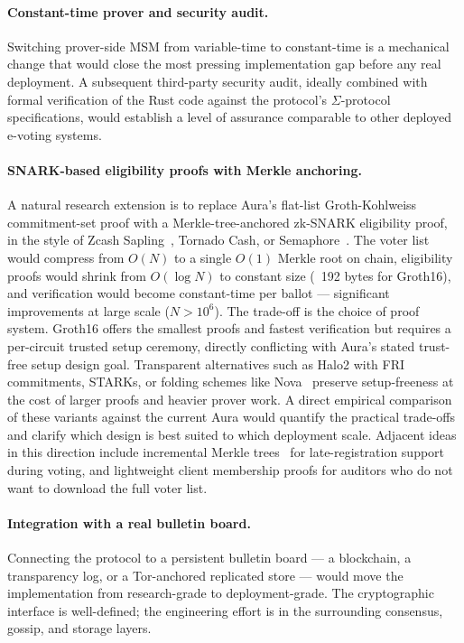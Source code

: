 \documentclass[12pt,a4paper,oneside]{report}
\begin{document}
\paragraph{Constant-time prover and security audit.} 
Switching prover-side MSM from variable-time to constant-time is a 
mechanical change that would close the most pressing implementation 
gap before any real deployment. A subsequent third-party security 
audit, ideally combined with formal verification of the Rust code 
against the protocol's $\Sigma$-protocol specifications, would 
establish a level of assurance comparable to other deployed 
e-voting systems.

\paragraph{SNARK-based eligibility proofs with Merkle anchoring.} 
A natural research extension is to replace Aura's flat-list 
Groth-Kohlweiss commitment-set proof with a Merkle-tree-anchored 
zk-SNARK eligibility proof, in the style of Zcash 
Sapling~\cite{zcash-sapling}, Tornado Cash, or 
Semaphore~\cite{semaphore}. The voter list would compress from $O(N)$ 
to a single $O(1)$ Merkle root on chain, eligibility proofs would 
shrink from $O(\log N)$ to constant size (~192 bytes for Groth16), 
and verification would become constant-time per ballot --- significant 
improvements at large scale ($N > 10^6$). The trade-off is the choice 
of proof system. Groth16 offers the smallest proofs and fastest 
verification but requires a per-circuit trusted setup ceremony, 
directly conflicting with Aura's stated trust-free setup design 
goal. Transparent alternatives such as Halo2 with FRI commitments, 
STARKs, or folding schemes like Nova~\cite{nova} preserve setup-freeness 
at the cost of larger proofs and heavier prover work. A direct 
empirical comparison of these variants against the current Aura would 
quantify the practical trade-offs and clarify which design is best 
suited to which deployment scale. Adjacent ideas in this direction 
include incremental Merkle trees~\cite{zcash-sapling} for 
late-registration support during voting, and lightweight client 
membership proofs for auditors who do not want to download the full 
voter list.

\paragraph{Integration with a real bulletin board.} 
Connecting the protocol to a persistent bulletin board --- a 
blockchain, a transparency log, or a Tor-anchored replicated store 
--- would move the implementation from research-grade to deployment-grade. 
The cryptographic interface is well-defined; the engineering effort 
is in the surrounding consensus, gossip, and storage layers.
\end{document}
